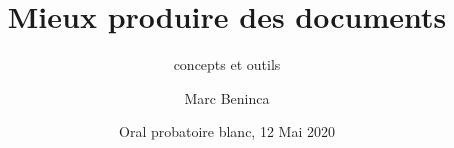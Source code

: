 \usepackage{fontspec}
\usepackage{multicol}
\usepackage{listings}

\setmainfont{DejaVu Sans}
\setmonofont{DejaVu Sans Mono}

\def\hititle{Mieux produire des documents}
\def\lotitle{concepts et outils}
\def\bititle{\hititle, \lotitle}

\title[\hititle]{\hititle}
\subtitle{\lotitle}
\author[M. Beninca]{Marc Beninca}
\date[Blanc 2020]{Oral probatoire blanc, 12 Mai 2020}
